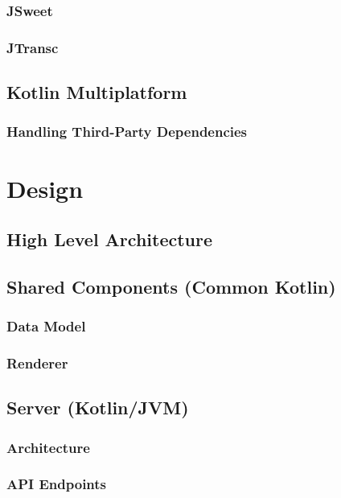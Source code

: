 \documentclass[12pt,a4paper,openright,twoside]{book}
\begin{document}
\subsection{JSweet}
\label{ssec:jsweet}
\subsection{JTransc}
\label{ssec:jtransc}
\section{Kotlin Multiplatform}
\label{sec:kotlin-multiplatform}
\subsection{Handling Third-Party Dependencies}
\label{ssec:handling-third-party-dependencies}
\chapter{Design}
\label{chap:design}
\section{High Level Architecture}
\label{sec:high-level-architecture}
\section{Shared Components (Common Kotlin)}
\label{sec:shared-components-common-kotlin}
\subsection{Data Model}
\label{ssec:data-model}
\subsection{Renderer}
\label{ssec:renderer}
\section{Server (Kotlin/JVM)}
\label{sec:server-kotlin-jvm}
\subsection{Architecture}
\label{ssec:architecture}
\subsection{API Endpoints}
\label{ssec:api-endpoints}
\end{document}
